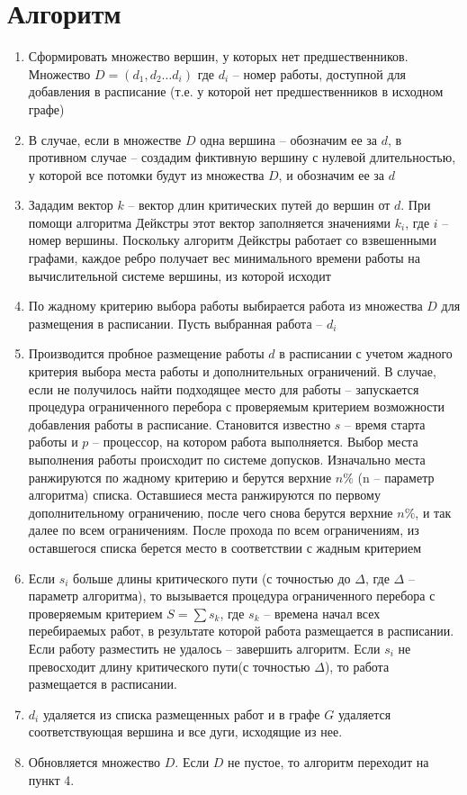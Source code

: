 \documentclass{article}
\begin{document}
\section{Алгоритм}
\begin{enumerate}
    \item Сформировать множество вершин, у которых нет предшественников. Множество $D = \left( d_1, d_2 \dots d_i \right)$ где $d_i$ – номер работы, доступной для добавления в расписание (т.е. у которой нет предшественников в исходном графе)
    \item В случае, если в множестве $D$ одна вершина – обозначим ее за $d$, в противном случае – создадим фиктивную вершину с нулевой длительностью, у которой все потомки будут из множества $D$, и обозначим ее за $d$
    \item Зададим вектор $k$ – вектор длин критических путей до вершин от $d$. При помощи алгоритма Дейкстры этот вектор заполняется значениями $k_i$, где $i$ – номер вершины. Поскольку алгоритм Дейкстры работает со взвешенными графами, каждое ребро получает вес минимального времени работы на вычислительной системе вершины, из которой исходит
    \item По жадному критерию выбора работы выбирается работа из множества $D$ для размещения в расписании. Пусть выбранная работа – $d_i$
    \item Производится пробное размещение работы $d$ в расписании с учетом жадного критерия выбора места работы и дополнительных ограничений. В случае, если не получилось найти подходящее место для работы – запускается процедура ограниченного перебора с проверяемым критерием возможности добавления работы в расписание. Становится известно $s$ – время старта работы и $p$ – процессор, на котором работа выполняется. Выбор места выполнения работы происходит по системе допусков. Изначально места ранжируются по жадному критерию и берутся верхние $n\%$ (n – параметр алгоритма) списка. Оставшиеся места ранжируются по первому дополнительному ограничению, после чего снова берутся верхние $n\%$, и так далее по всем ограничениям. После прохода по всем ограничениям, из оставшегося списка берется место в соответствии с жадным критерием
    \item Если $s_i$ больше длины критического пути (с точностью до $\Delta$, где $\Delta$ – параметр алгоритма), то вызывается процедура ограниченного перебора с проверяемым критерием $S = \sum s_k$, где $s_k$ – времена начал всех перебираемых работ, в результате которой работа размещается в расписании. Если работу разместить не удалось – завершить алгоритм. Если $s_i$ не превосходит длину критического пути(с точностью $\Delta$), то работа размещается в расписании.
    \item $d_i$ удаляется из списка размещенных работ и в графе $G$ удаляется соответствующая вершина и все дуги, исходящие из нее.  
    \item Обновляется множество $D$. Если $D$ не пустое, то алгоритм переходит на пункт 4.
\end{enumerate}
\end{document}
